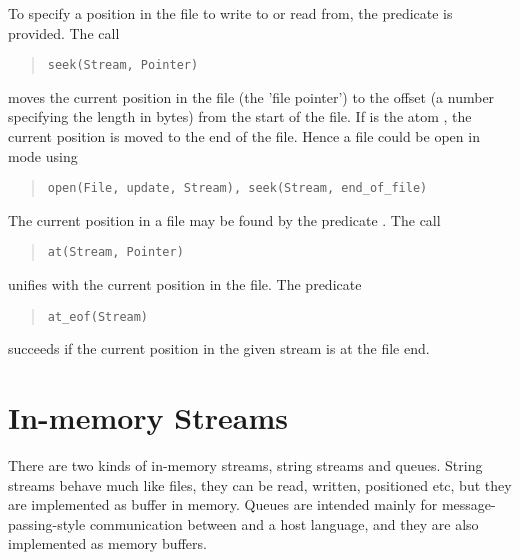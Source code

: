 To specify a position in the file
to write to or read from, the predicate
is provided. The
call
\begin{quote}
\begin{verbatim}
seek(Stream, Pointer)
\end{verbatim}
\end{quote}
moves the current position in the
file (the 'file pointer') to the offset  (a number specifying
the length in bytes) from
the start of the file.
If  is the atom , the
current position is moved to the end of the file.
Hence a file could be open in  mode using
\begin{quote}
\begin{verbatim}
open(File, update, Stream), seek(Stream, end_of_file)
\end{verbatim}
\end{quote}
The current position in a file may be found by the predicate
.
The call
\begin{quote}
\begin{verbatim}
at(Stream, Pointer)
\end{verbatim}
\end{quote}
unifies  with the current position in the file.
The predicate
\begin{quote}
\begin{verbatim}
at_eof(Stream)
\end{verbatim}
\end{quote}
succeeds if the current position in the given stream
is at the file end.


\section{In-memory Streams}
There are two kinds of in-memory streams, string streams and queues.
String streams behave much like files, they can be read, written,
positioned etc, but they are implemented as buffer in memory.
Queues are intended mainly for message-passing-style communication
between \eclipse and a host language, and they are also implemented as
memory buffers.


